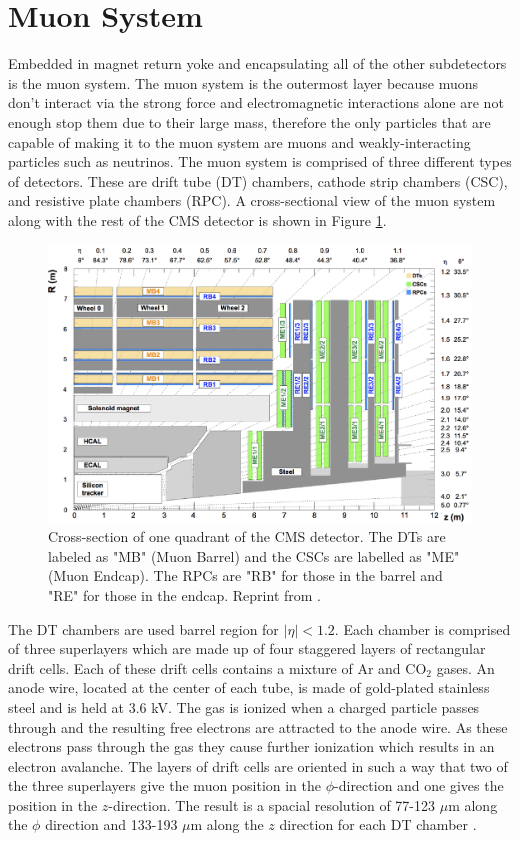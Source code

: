 \section{Muon System}
Embedded in magnet return yoke and encapsulating all of the other subdetectors is the muon system.  The muon system is the outermost layer because muons don't interact via the strong force and electromagnetic interactions alone are not enough stop them due to their large mass, therefore the only particles that are capable of making it to the muon system are muons and weakly-interacting particles such as neutrinos.  The muon system is comprised of three different types of detectors.  These are drift tube (DT) chambers, cathode strip chambers (CSC), and resistive plate chambers (RPC).  A cross-sectional view of the muon system along with the rest of the CMS detector is shown in Figure \ref{fig:cms-muo-16-001figure001}.

\begin{figure}
	\centering
	\includegraphics[width=0.7\linewidth]{Figures/CMS-MUO-16-001_Figure_001}
	\caption{Cross-section of one quadrant of the CMS detector. The DTs are labeled as "MB" (Muon Barrel) and the CSCs are labelled as "ME" (Muon Endcap). The RPCs are "RB" for those in the barrel and "RE" for those in the endcap. Reprint from \cite{Sirunyan_2018}.}
	\label{fig:cms-muo-16-001figure001}
\end{figure}

The DT chambers are used barrel region for $|\eta|<1.2$.  Each chamber is comprised of three superlayers which are made up of four staggered layers of rectangular drift cells.  Each of these drift cells contains a mixture of Ar and CO$_2$ gases. An anode wire, located at the center of each tube, is made of gold-plated stainless steel and is held at 3.6 kV.  The gas is ionized when a charged particle passes through and the resulting free electrons are attracted to the anode wire. As these electrons pass through the gas they cause further ionization which results in an electron avalanche.  The layers of drift cells are oriented in such a way that two of the three superlayers give the muon position in the $\phi$-direction and one gives the position in the $z$-direction.  The result is a spacial resolution of 77-123 $\mu$m along the $\phi$ direction and 133-193 $\mu$m along the $z$ direction for each DT chamber \cite{muon_collaboration_2013}.

